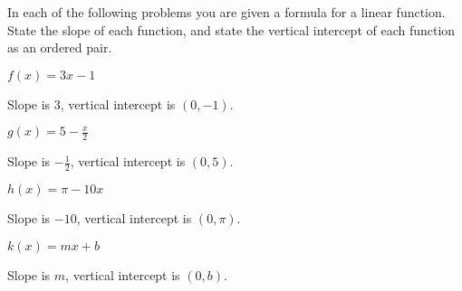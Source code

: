 \begin{exercises}
\begin{problem}
In each of the following problems you are given a formula for a linear function. 
State the slope of each function, and state the vertical intercept 
of each function as an ordered pair.
\begin{multicols}{4}
	\begin{subproblem}
		$f(x)=3x-1$ 
		\begin{shortsolution}
			Slope is $3$, vertical intercept is $(0,-1)$. 
		\end{shortsolution}
	\end{subproblem}
	\begin{subproblem}
		$g(x)=5-\frac{x}{2}$ 
		\begin{shortsolution}
			Slope is $-\frac{1}{2}$, vertical intercept is $(0,5)$. 
		\end{shortsolution}
	\end{subproblem}
	\begin{subproblem}
		$h(x)=\pi-10x$ 
		\begin{shortsolution}
			Slope is $-10$, vertical intercept is $(0,\pi)$. 
		\end{shortsolution}
	\end{subproblem}
	\begin{subproblem}
		$k(x)=mx+b$ 
		\begin{shortsolution}
			Slope is $m$, vertical intercept is $(0,b)$. 
		\end{shortsolution}
	\end{subproblem}
\end{multicols}
\end{problem}


\end{exercises}
